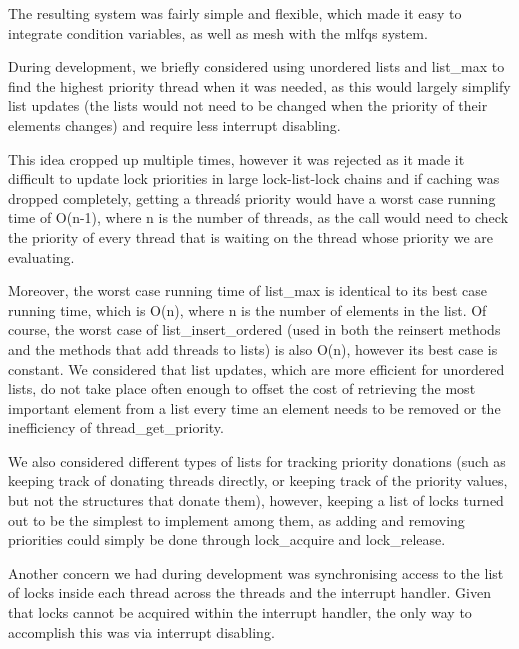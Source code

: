 The resulting system was fairly simple and flexible, which made it easy to integrate condition variables, as well as mesh with the mlfqs system.


During development, we briefly considered using unordered lists and list\_max to find the highest priority thread when it was needed, as this would largely simplify list updates (the lists would not need to be changed when the priority of their elements changes) and require less interrupt disabling.

This idea cropped up multiple times, however it was rejected as it made it difficult to update lock priorities in large lock-list-lock chains and if caching was dropped completely, getting a thread\'s priority would have a worst case running time of O(n-1), where n is the number of threads, as the call would need to check the priority of every thread that is waiting on the thread whose priority we are evaluating.

Moreover, the worst case running time of list\_max is identical to its best case running time, which is O(n), where n is the number of elements in the list.
Of course, the worst case of list\_insert\_ordered (used in both the reinsert methods and the methods that add threads to lists) is also O(n), however its best case is constant.
We considered that list updates, which are more efficient for unordered lists, do not take place often enough to offset the cost of retrieving the most important element from a list every time an element needs to be removed or the inefficiency of thread\_get\_priority.

We also considered different types of lists for tracking priority donations (such as keeping track of donating threads directly, or keeping track of the priority values, but not the structures that donate them), however, keeping a list of locks turned out to be the simplest to implement among them, as adding and removing priorities could simply be done through lock\_acquire and lock\_release.

Another concern we had during development was synchronising access to the list of locks inside each thread across the threads and the interrupt handler. Given that locks cannot be acquired within the interrupt handler, the only way to accomplish this was via interrupt disabling.
